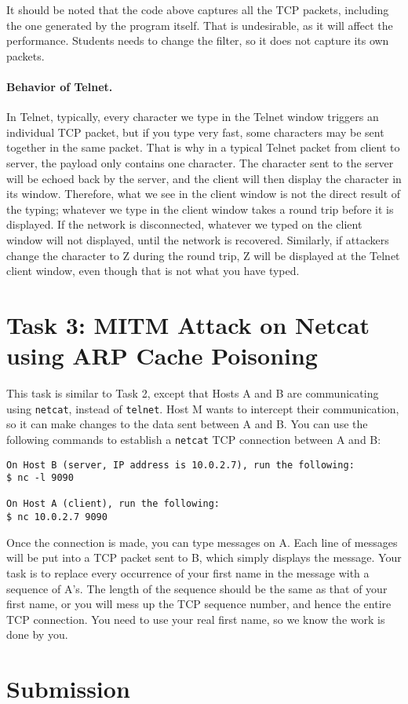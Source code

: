 It should be noted that the code above captures all the TCP 
packets, including the one generated by the program itself. That is 
undesirable, as it will affect
the performance. Students needs to change the filter, so it does not capture 
its own packets. 


\paragraph{Behavior of Telnet.}
In Telnet, typically, every character we type in the Telnet window triggers
an individual TCP packet, but if you type very fast, some characters may be 
sent together in the same packet. 
That is why in a typical Telnet packet from client to server, 
the payload only contains one character.  The
character sent to the server will be echoed back by the server, 
and the client will then display the
character in its window. Therefore, what we see in the client window is not the direct result
of the typing; whatever we type in the client window takes a round trip before it is displayed.
If the network is disconnected, whatever we typed on the client window will not displayed,
until the network is recovered. Similarly, if attackers change the character to Z during the
round trip, Z will be displayed at the Telnet client window, even though
that is not what you have typed.





\section{Task 3: MITM Attack on Netcat using ARP Cache Poisoning}

This task is similar to Task 2, except that
Hosts A and B are communicating using \texttt{netcat}, instead of \texttt{telnet}.
Host M wants to intercept their
communication, so it can make changes to the data sent between A and B.
You can use the following commands to establish a \texttt{netcat} TCP
connection between A and B:


\begin{lstlisting}
On Host B (server, IP address is 10.0.2.7), run the following:
$ nc -l 9090

On Host A (client), run the following:
$ nc 10.0.2.7 9090
\end{lstlisting}
 

Once the connection is made, you can type messages on A.
Each line of messages will be put into a TCP packet sent 
to B, which simply displays the message.  
Your task is to replace every occurrence of your first name in the 
message with a sequence of A's. The length of the sequence should be the 
same as that of your first name, or you will mess up the TCP sequence
number, and hence the entire TCP connection. You need to use your real
first name, so we know the work is done by you.  



\section{Submission}

\seedsubmission






